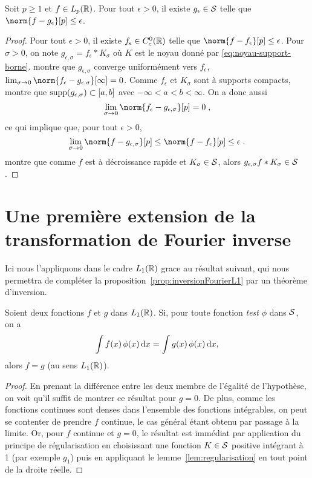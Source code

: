 \begin{theorem}
\label{theo:densite-mcs-Lp}
Soit $p \geq 1$ et $f \in L_p(\mathbb{R})$. Pour tout $\epsilon > 0$, il existe $g_\epsilon \in \mathcal{S}$ telle que
$\norm{f - g_\epsilon}[p] \leq \epsilon$.
\end{theorem}
\begin{proof}
Pour tout $\epsilon > 0$, il existe $f_\epsilon \in C_c^0(\mathbb{R})$ telle que $\norm{f - f_\epsilon}[p] \leq \epsilon$.
Pour $\sigma > 0$, on note $g_{\epsilon,\sigma} = f_\epsilon * K_\sigma$ o\`{u} $K$ est le noyau donn\'e par \eqref{eq:noyau-support-borne}.  montre que $g_{\epsilon,\sigma}$ converge uniform\'ement vers $f_\epsilon$, \ie\ $\lim_{\sigma \to 0} \norm{f_\epsilon - g_{\epsilon,\sigma}}[\infty]= 0$. Comme $f_\epsilon$ et $K_\sigma$ sont \`{a} supports compacts,  montre que $\mathrm{supp}(g_{\epsilon,\sigma}) \subset \left[a,b\right]$ avec $-\infty < a < b < \infty$.
On a donc aussi
$$
\lim_{\sigma \to 0} \norm{f_\epsilon - g_{\epsilon,\sigma}}[p] = 0 \eqsp,
$$
ce qui implique que, pour tout $\epsilon > 0$,
$$
\lim_{\sigma \to 0} \norm{f - g_{\epsilon,\sigma}}[p] \leq \norm{f-f_\epsilon}[p] \leq \epsilon \eqsp.
$$
 montre que comme $f$ est \`{a} d\'ecroissance rapide et $K_\sigma \in \mathcal{S}$, alors $g_{\epsilon,\sigma} f * K_\sigma \in \mathcal{S}$.
\end{proof}


\section{Une premi\`ere extension de la transformation de Fourier inverse}
Ici nous l'appliquons dans le cadre $L_1(\mathbb{R})$ grace au r{\'e}sultat suivant, qui nous permettra de compl{\'e}ter la
proposition~\ref{prop:inversionFourierL1} par un th{\'e}or{\`e}me d'inversion.
\begin{proposition}\label{prop:DualiteSchwartz}
Soient deux fonctions $f$ et $g$ dans $L_1(\mathbb{R})$. Si, pour toute fonction \textit{test} $\phi$ dans $\mathcal{S}$, on a
$$
\int f(x)\,\phi(x)\,\mathrm{d} x= \int g(x)\,\phi(x)\,\mathrm{d} x,
$$
alors $f=g$ (au sens $L_1(\mathbb{R})$).
\end{proposition}
\begin{proof}
En prenant la diff{\'e}rence entre les deux membre de l'{\'e}galit{\'e} de l'hypoth{\`e}se, on voit qu'il suffit de montrer ce r{\'e}sultat pour
$g=0$. De plus, comme les fonctions continues sont denses dans l'ensemble des fonctions int\'egrables, on peut se contenter de prendre $f$ continue, le cas g{\'e}n{\'e}ral {\'e}tant
obtenu par passage {\`a} la limite. Or, pour $f$ continue et $g=0$, le r{\'e}sultat est imm{\'e}diat par application du principe de
r{\'e}gularisation en choisissant une fonction $K\in\mathcal{S}$ positive int{\'e}grant {\`a} 1 (par exemple $g_1$) puis en appliquant le
lemme~\ref{lem:regularisation} en tout point de la droite r{\'e}elle.
\end{proof}

